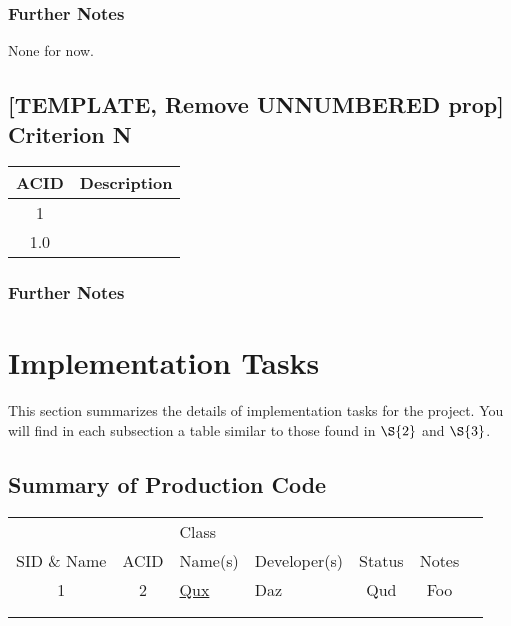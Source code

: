 \documentclass[11pt]{article}
\begin{document}
\subsubsection*{Further Notes}
\label{sec:orgf03d29f}
None for now.

\subsection*{[TEMPLATE, Remove UNNUMBERED prop] Criterion N}
\label{sec:orgf9b334c}
\begin{center}
\begin{tabular}{|c|l|}
ACID & Description\\
\hline
1 & \\
\hline
1.0 & \\
\end{tabular}
\end{center}

\subsubsection*{Further Notes}
\label{sec:orgf0c34e0}
\section{Implementation Tasks}
\label{sec:org3ace040}
This section summarizes the details of implementation tasks for the project. You will find in each
subsection a table similar to those found in \hyperref[sec:org588b969]{\(\S{2}\)} and \hyperref[sec:org920f3b8]{\(\S{3}\)}.

\subsection{Summary of Production Code}
\label{sec:org1b09335}

\begin{center}
\begin{tabular}{|c|c|p{3.5cm}|p{3.5cm}|c|c|c|}
 &  & Class &  &  & \\
SID \& Name & ACID & Name(s) & Developer(s) & Status & Notes\\
\hline
1 & 2 & \hyperref[sec:orgd0dffef]{Qux} & Daz & Qud & Foo\\
\hline
 &  &  &  &  & \\
\hline
 &  &  &  &  & \\
\end{tabular}
\end{center}


\end{document}
